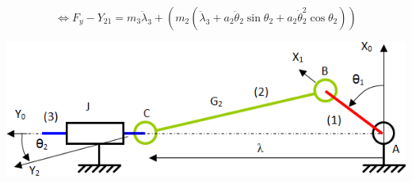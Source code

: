\begin{multicols}{2}
\begin{corrige}
\begin{itemize}
$$
\Longleftrightarrow
F_y-Y_{21}=m_3\ddot{\lambda}_3+\left(  m_2 \left(\ddot{\lambda}_3+a_2 \ddot{\theta}_2 \sin \theta_2+a_2 \dot{\theta}_2^2\cos\theta_2\right)\right)
$$
\end{itemize}
\end{corrige}
\else
\fi

\ifprof
\else
\end{multicols}
\fi

\ifprof
\else
\begin{center}
\includegraphics[width=.7\linewidth]{images/fig_03}
\end{center}
\fi

